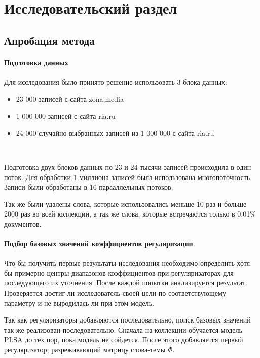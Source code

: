 \chapter{Исследовательский раздел}

%
\section{Апробация метода}

\subsubsection{Подготовка данных}

Для исследования было принято решение использовать 3 блока данных:

\begin{itemize}
    \item 23 000 записей с сайта zona.media
    \item 1 000 000 записей с сайта ria.ru
    \item 24 000 случайно выбранных записей из 1 000 000 с сайта ria.ru
\end{itemize}

~\

Подготовка двух блоков данных по 23 и 24 тысячи записей происходила в один поток. Для обработки 1 миллиона записей была использована многопоточность. Записи были обработаны в 16 парааллельных потоков.

Так же были удалены слова, которые использовались меньше 10 раз и больше 2000 раз во всей коллекции, а так же слова, которые встречаются только в 0.01\% документов.

\subsubsection{Подбор базовых значений коэффициентов регуляризации}

Что бы получить первые результаты исследования необходимо определить хотя бы примерно центры диапазонов коэффициентов при регуляризаторах для последующего их уточнения. После каждой попытки анализируется результат. Проверяется достиг ли исследователь своей цели по соответствующему параметру и не выродилась ли при этом модель.

Так как регуляризаторы добавляются последовательно, поиск базовых значений так же реализован последовательно. Сначала на коллекции обучается модель PLSA до тех пор, пока модель не сойдется. После этого добавляется первый регуляризатор, разреживающий матрицу слова-темы $\Phi$.

